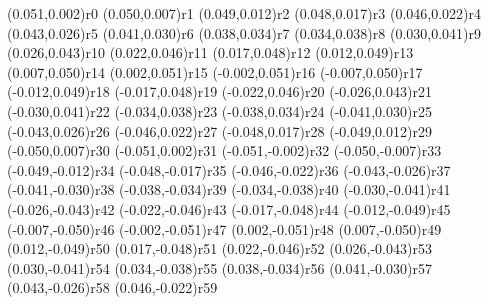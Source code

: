 \pstGeonode(0.051,0.002){r0}
\pstGeonode(0.050,0.007){r1}
\pstGeonode(0.049,0.012){r2}
\pstGeonode(0.048,0.017){r3}
\pstGeonode(0.046,0.022){r4}
\pstGeonode(0.043,0.026){r5}
\pstGeonode(0.041,0.030){r6}
\pstGeonode(0.038,0.034){r7}
\pstGeonode(0.034,0.038){r8}
\pstGeonode(0.030,0.041){r9}
\pstGeonode(0.026,0.043){r10}
\pstGeonode(0.022,0.046){r11}
\pstGeonode(0.017,0.048){r12}
\pstGeonode(0.012,0.049){r13}
\pstGeonode(0.007,0.050){r14}
\pstGeonode(0.002,0.051){r15}
\pstGeonode(-0.002,0.051){r16}
\pstGeonode(-0.007,0.050){r17}
\pstGeonode(-0.012,0.049){r18}
\pstGeonode(-0.017,0.048){r19}
\pstGeonode(-0.022,0.046){r20}
\pstGeonode(-0.026,0.043){r21}
\pstGeonode(-0.030,0.041){r22}
\pstGeonode(-0.034,0.038){r23}
\pstGeonode(-0.038,0.034){r24}
\pstGeonode(-0.041,0.030){r25}
\pstGeonode(-0.043,0.026){r26}
\pstGeonode(-0.046,0.022){r27}
\pstGeonode(-0.048,0.017){r28}
\pstGeonode(-0.049,0.012){r29}
\pstGeonode(-0.050,0.007){r30}
\pstGeonode(-0.051,0.002){r31}
\pstGeonode(-0.051,-0.002){r32}
\pstGeonode(-0.050,-0.007){r33}
\pstGeonode(-0.049,-0.012){r34}
\pstGeonode(-0.048,-0.017){r35}
\pstGeonode(-0.046,-0.022){r36}
\pstGeonode(-0.043,-0.026){r37}
\pstGeonode(-0.041,-0.030){r38}
\pstGeonode(-0.038,-0.034){r39}
\pstGeonode(-0.034,-0.038){r40}
\pstGeonode(-0.030,-0.041){r41}
\pstGeonode(-0.026,-0.043){r42}
\pstGeonode(-0.022,-0.046){r43}
\pstGeonode(-0.017,-0.048){r44}
\pstGeonode(-0.012,-0.049){r45}
\pstGeonode(-0.007,-0.050){r46}
\pstGeonode(-0.002,-0.051){r47}
\pstGeonode(0.002,-0.051){r48}
\pstGeonode(0.007,-0.050){r49}
\pstGeonode(0.012,-0.049){r50}
\pstGeonode(0.017,-0.048){r51}
\pstGeonode(0.022,-0.046){r52}
\pstGeonode(0.026,-0.043){r53}
\pstGeonode(0.030,-0.041){r54}
\pstGeonode(0.034,-0.038){r55}
\pstGeonode(0.038,-0.034){r56}
\pstGeonode(0.041,-0.030){r57}
\pstGeonode(0.043,-0.026){r58}
\pstGeonode(0.046,-0.022){r59}
